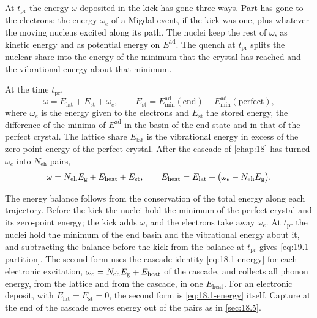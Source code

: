 At $t_{\mathrm{pr}}$ the energy $\omega$ deposited in the kick has gone three ways. Part has gone to the electrons: the energy $\omega_e$ of a Migdal event, if the kick was one, plus whatever the moving nucleus excited along its path. The nuclei keep the rest of $\omega$, as kinetic energy and as potential energy on $E^{\mathrm{ad}}$. The quench at $t_{\mathrm{pr}}$ splits the nuclear share into the energy of the minimum that the crystal has reached and the vibrational energy about that minimum.
\begin{keyresult}
At the time $t_{\mathrm{pr}}$,
\begin{equation}
  \omega = E_{\mathrm{lat}} + E_{\mathrm{st}} + \omega_e , \qquad
  E_{\mathrm{st}} = E^{\mathrm{ad}}_{\mathrm{min}}(\mathrm{end}) - E^{\mathrm{ad}}_{\mathrm{min}}(\mathrm{perfect}) ,
  \label{eq:19.1-partition}
\end{equation}
where $\omega_e$ is the energy given to the electrons and $E_{\mathrm{st}}$ the stored energy, the difference of the minima of $E^{\mathrm{ad}}$ in the basin of the end state and in that of the perfect crystal. The lattice share $E_{\mathrm{lat}}$ is the vibrational energy in excess of the zero-point energy of the perfect crystal. After the cascade of \cref{chap:18} has turned $\omega_e$ into $N_{\mathrm{eh}}$ pairs,
\begin{equation}
  \omega = N_{\mathrm{eh}}E_{\mathrm{g}} + E_{\mathrm{heat}} + E_{\mathrm{st}} , \qquad
  E_{\mathrm{heat}} = E_{\mathrm{lat}} + \bigl(\omega_e - N_{\mathrm{eh}}E_{\mathrm{g}}\bigr) .
  \label{eq:19.1-heat}
\end{equation}
\end{keyresult}
\noindent The energy balance follows from the conservation of the total energy along each trajectory. Before the kick the nuclei hold the minimum of the perfect crystal and its zero-point energy; the kick adds $\omega$, and the electrons take away $\omega_e$. At $t_{\mathrm{pr}}$ the nuclei hold the minimum of the end basin and the vibrational energy about it, and subtracting the balance before the kick from the balance at $t_{\mathrm{pr}}$ gives \cref{eq:19.1-partition}. The second form uses the cascade identity \cref{eq:18.1-energy} for each electronic excitation, $\omega_e = N_{\mathrm{eh}}E_{\mathrm{g}} + E_{\mathrm{heat}}$ of the cascade, and collects all phonon energy, from the lattice and from the cascade, in one $E_{\mathrm{heat}}$. For an electronic deposit, with $E_{\mathrm{lat}} = E_{\mathrm{st}} = 0$, the second form is \cref{eq:18.1-energy} itself. Capture at the end of the cascade moves energy out of the pairs as in \cref{sec:18.5}.

